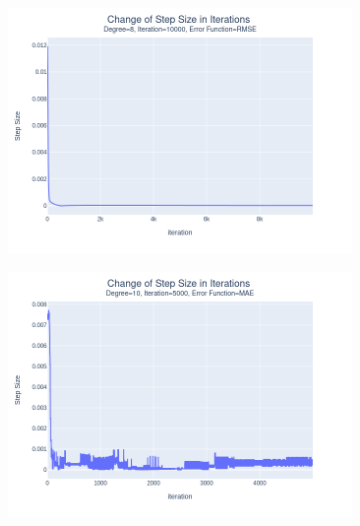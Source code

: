 \documentclass[14pt,a4]{article}
\begin{document}
\begin{figure}[h]
\begin{subfigure}{0.3\linewidth}
        \includegraphics[width=\textwidth]{images/implementation/q1/part_d/step_size/8_10000_RMSE.png}
    \end{subfigure}
    \newline
    \begin{subfigure}{0.3\linewidth}
        \centering
        \includegraphics[width=\textwidth]{images/implementation/q1/part_d/step_size/10_5000_MAE.png}
    \end{subfigure}
    \hfill
    \begin{subfigure}{0.3\textwidth}
        \centering

\end{subfigure}
\end{figure}
\end{document}
